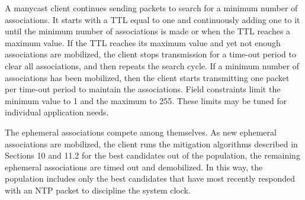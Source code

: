 A manycast client continues sending packets to search for a minimum
number of associations. It starts with a TTL equal to one and
continuously adding one to it until the minimum number of
associations is made or when the TTL reaches a maximum value. If the
TTL reaches its maximum value and yet not enough associations are
mobilized, the client stops transmission for a time-out period to
clear all associations, and then repeats the search cycle. If a
minimum number of associations has been mobilized, then the client
starts transmitting one packet per time-out period to maintain the
associations. Field constraints limit the minimum value to 1 and the
maximum to 255. These limits may be tuned for individual application
needs.

The ephemeral associations compete among themselves. As new
ephemeral associations are mobilized, the client runs the mitigation
algorithms described in Sections 10 and 11.2 for the best candidates
out of the population, the remaining ephemeral associations are timed
out and demobilized. In this way, the population includes only the
best candidates that have most recently responded with an NTP packet
to discipline the system clock.
